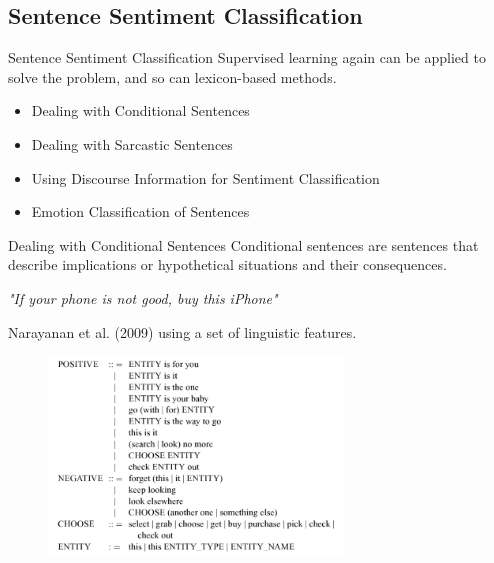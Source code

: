 \documentclass[xcolor=table]{beamer}
\begin{document}
\subsection{Sentence Sentiment Classification}
\begin{frame}{Sentence Sentiment Classification}
    Supervised learning again can be applied to solve the problem, and so can lexicon-based methods.
    
    \begin{itemize}
        \item Dealing with Conditional Sentences
        \item Dealing with Sarcastic Sentences
        \item Using Discourse Information for Sentiment Classification
        \item Emotion Classification of Sentences
    \end{itemize}
\end{frame}

\begin{frame}{Dealing with Conditional Sentences}
    Conditional sentences are sentences that describe implications or hypothetical situations and their consequences.
    
    \begin{example}
    \textit{"If your phone is not good, buy this iPhone"} \\
    \end{example}
    
    Narayanan et al. (2009) \cite{narayanan2009sentiment} using a set of linguistic features.
    
    \begin{figure}
        \centering
        \includegraphics[width=0.7\textwidth]{img/SA-cond.PNG}
    \end{figure}
\end{frame}
\end{document}
